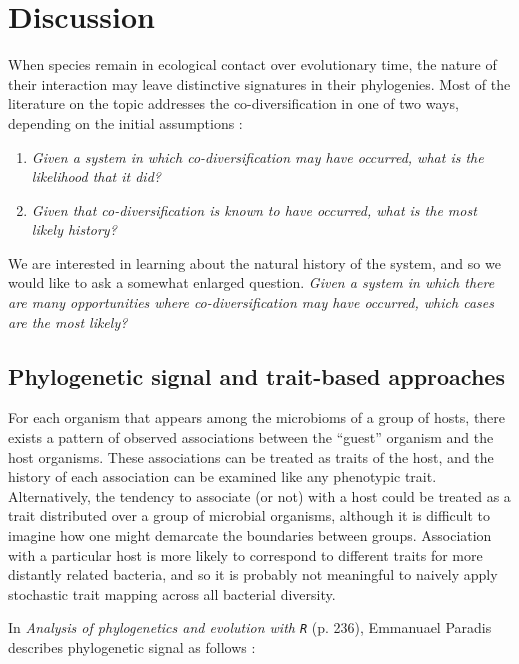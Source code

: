\section{Discussion}

When species remain in ecological contact over evolutionary time, the nature of their interaction may leave distinctive signatures in their phylogenies. \cite{bastolla2009architecture} Most of the literature on the topic addresses the co-diversification in one of two ways, depending on the initial assumptions :

\begin{enumerate}
    \item {\em Given a system in which co-diversification may have occurred, what is the likelihood that it did?}

    \item {\em Given that co-diversification is known to have occurred, what is the most likely history?}
\end{enumerate}

We are interested in learning about the natural history of the system, and so we would like to ask a somewhat enlarged question. {\em Given a system in which there are many opportunities where co-diversification may have occurred, which cases are the most likely?} 

\subsection{Phylogenetic signal and trait-based approaches}

For each organism that appears among the microbioms of a group of hosts, there exists a pattern of observed associations between the ``guest'' organism and the host organisms. These associations can be treated as traits of the host, and the history of each association can be examined like any phenotypic trait. Alternatively, the tendency to associate (or not) with a host could be treated as a trait distributed over a group of microbial organisms, although it is difficult to imagine how one might demarcate the boundaries between groups. Association with a particular host is more likely to correspond to different traits for more distantly related bacteria, and so it is probably not meaningful to naively apply stochastic trait mapping across all bacterial diversity.

In {\em Analysis of phylogenetics and evolution with {\tt R}} (p. 236), Emmanuael Paradis describes phylogenetic signal as follows :

